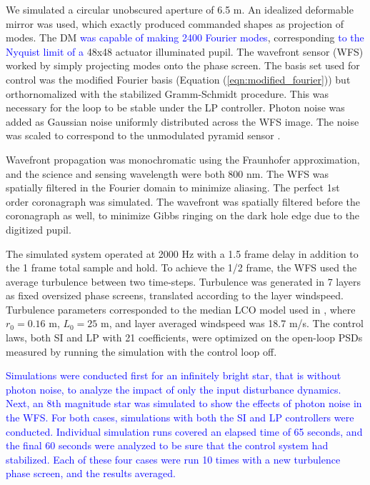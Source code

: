 \documentclass[10pt,preprint]{aastex631}
\newcommand{\jrmadd}[1]{\textcolor{blue}{#1}}
\begin{document}
We simulated a circular unobscured aperture of 6.5 m.   An idealized deformable mirror was used, which exactly produced commanded shapes as projection of modes.  The DM \jrmadd{was capable of making 2400 Fourier modes}, corresponding \jrmadd{to the Nyquist limit of a} 48x48 actuator illuminated pupil.  The wavefront sensor (WFS) worked by simply projecting modes onto the phase screen.  The basis set used for control was the modified Fourier basis (Equation (\ref{eqn:modified_fourier})) but orthornomalized with the stabilized Gramm-Schmidt procedure.  This was necessary for the loop to be stable under the LP controller.  Photon noise was added as Gaussian noise uniformly distributed across the WFS image.  The noise was scaled to correspond to the unmodulated pyramid sensor  \cite[$\beta_p = \sqrt{2}$,][]{2005ApJ...629..592G}.

Wavefront propagation was monochromatic using the Fraunhofer approximation, and the science and sensing wavelength were both 800 nm.  The WFS was spatially filtered in the Fourier domain to minimize aliasing.  The perfect 1st order coronagraph was simulated.  The wavefront was spatially filtered before the coronagraph as well, to minimize Gibbs ringing on the dark hole edge due to the digitized pupil.

The simulated system operated at 2000 Hz with a 1.5 frame delay in addition to the 1 frame total sample and hold.  To achieve the 1/2 frame, the WFS used the average turbulence between two time-steps.  Turbulence was generated in 7 layers as fixed oversized phase screens, translated according to the layer windspeed.   Turbulence parameters corresponded to the median LCO model used in \citet{2018JATIS...4a9001M}, where $r_0 = 0.16$ m, $L_0 = 25$ m, and layer averaged windspeed was 18.7 m/s.  The control laws, both SI and LP with 21 coefficients, were optimized on the open-loop PSDs measured by running the simulation with the control loop off.

\jrmadd{Simulations were conducted first for an infinitely bright star, that is without photon noise, to analyze the impact of only the input disturbance dynamics.  Next, an 8th magnitude star was simulated to show the effects of photon noise in the WFS.  For both cases, simulations with both the SI and LP controllers were conducted.  Individual simulation runs covered an elapsed time of 65 seconds, and the final 60 seconds were analyzed to be sure that the control system had stabilized.  Each of these four cases were run 10 times with a new turbulence phase screen, and the results averaged.}
\end{document}
